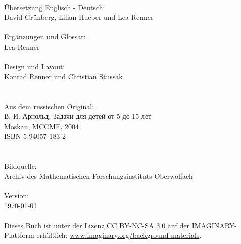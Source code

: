 \\
Übersetzung Englisch - Deutsch:\\
\null\quad David Grünberg, Lilian Hueber und Lea Renner\\
\\
Ergänzungen und Glossar:\\
\null\quad Lea Renner\\
\\
Design und Layout:\\
\null\quad Konrad Renner und Christian Stussak\\
\\
\\
Aus dem russischen Original:\\
\null\quad \textrussian{В. И. Арнольд: Задачи для детей от 5 до 15 лет}\\
\null\quad Moskau, MCCME, 2004\\
\null\quad ISBN 5-94057-183-2\\
\\
\\
Bildquelle:\\
\null\quad Archiv des Mathematischen Forschungsinstituts Oberwolfach\\
\\
Version:\\
\null\quad \today\\
\\
Dieses Buch ist unter der Lizenz CC BY-NC-SA 3.0 auf der IMAG\-I\-NARY-Plattform erhältlich: \href{http://www.imaginary.org/background-materials}{www.imaginary.org/background-materials}.%
%
\clearpage
\thispagestyle{empty}
\null


